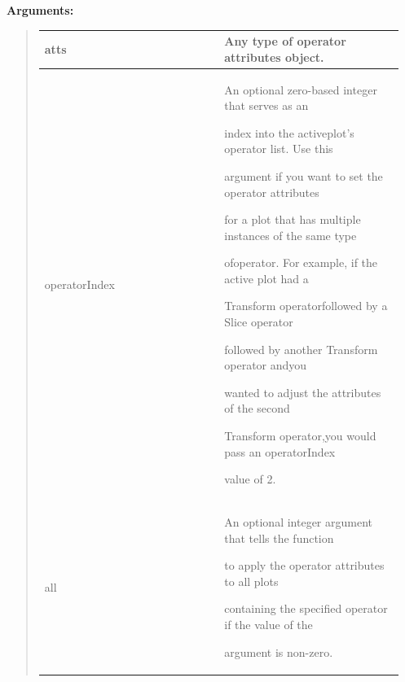 \documentclass[letterpaper,10pt,english]{sphinxmanual}
\begin{document}
\begin{DUlineblock}{0em}
\item[] 
\item[] \textbf{Arguments:}
\end{DUlineblock}
\begin{quote}

\begin{tabular}{|p{0.475\linewidth}|p{0.475\linewidth}|}
\hline

atts
 & 
Any type of operator attributes object.
\\
\hline
operatorIndex
 & 
\begin{DUlineblock}{0em}
\item[] An optional zero-based integer that serves as an
\item[] index into the activeplot's operator list. Use this
\item[] argument if you want to set the operator attributes
\item[] for a plot that has multiple instances of the same type
\item[] ofoperator. For example, if the active plot had a
\item[] Transform operatorfollowed by a Slice operator
\item[] followed by another Transform operator andyou
\item[] wanted to adjust the attributes of the second
\item[] Transform operator,you would pass an operatorIndex
\item[] value of 2.
\end{DUlineblock}
\\
\hline
all
 & 
\begin{DUlineblock}{0em}
\item[] An optional integer argument that tells the function
\item[] to apply the operator attributes to all plots
\item[] containing the specified operator if the value of the
\item[] argument is non-zero.
\end{DUlineblock}
\\
\hline\end{tabular}

\end{quote}
\end{document}
